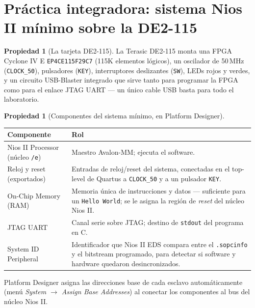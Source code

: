 \documentclass[11pt,letterpaper]{article}
\theoremstyle{definition}
\newtheorem{propiedad}[definicion]{Propiedad}
\begin{document}
\section{Práctica integradora: sistema Nios II mínimo sobre la DE2-115}

\begin{propiedad}[La tarjeta DE2-115]
La Terasic DE2-115 monta una FPGA Cyclone IV E \texttt{EP4CE115F29C7} (115K elementos lógicos), un
oscilador de 50\,MHz (\texttt{CLOCK\_50}), pulsadores (\texttt{KEY}), interruptores deslizantes
(\texttt{SW}), LEDs rojos y verdes, y un circuito USB-Blaster integrado que sirve tanto para
programar la FPGA como para el enlace JTAG UART --- un único cable USB basta para todo el
laboratorio.
\end{propiedad}

\begin{propiedad}[Componentes del sistema mínimo, en Platform Designer]
\begin{center}
\begin{tabular}{|l|p{9.5cm}|}
\hline
\textbf{Componente} & \textbf{Rol} \\ \hline
Nios II Processor (núcleo \texttt{/e}) & Maestro Avalon-MM; ejecuta el software. \\ \hline
Reloj y reset (exportados) & Entradas de reloj/reset del sistema, conectadas en el top-level de
  Quartus a \texttt{CLOCK\_50} y a un pulsador \texttt{KEY}. \\ \hline
On-Chip Memory (RAM) & Memoria única de instrucciones y datos --- suficiente para un
  \texttt{Hello World}; se le asigna la región de \emph{reset} del núcleo Nios II. \\ \hline
JTAG UART & Canal serie sobre JTAG; destino de \texttt{stdout} del programa en C. \\ \hline
System ID Peripheral & Identificador que Nios II EDS compara entre el \texttt{.sopcinfo} y el
  bitstream programado, para detectar si software y hardware quedaron desincronizados. \\ \hline
\end{tabular}
\end{center}
Platform Designer asigna las direcciones base de cada esclavo automáticamente (menú
\emph{System $\to$ Assign Base Addresses}) al conectar los componentes al bus del núcleo Nios II.
\end{propiedad}
\end{document}
